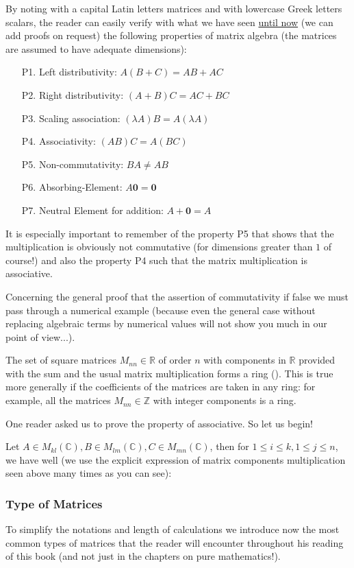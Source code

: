 	By noting with a capital Latin letters matrices and with lowercase Greek letters scalars, the reader can easily verify with what we have seen \underline{until now} (we can add proofs on request) the following properties of matrix algebra (the matrices are assumed to have adequate dimensions):
	\begin{enumerate}
		\item[P1.] Left distributivity: $A(B+C)=AB+AC$
		\item[P2.] Right distributivity: $(A+B)C=AC+BC$
		\item[P3.] Scaling association: $(\lambda A)B=A(\lambda A)$
		\item[P4.] Associativity: $(AB)C=A(BC)$
		\item[P5.] Non-commutativity: $BA\neq AB$
		\item[P6.] Absorbing-Element: $A\mathbf{0}=\mathbf{0}$
		\item[P7.] Neutral Element for addition: $A+\mathbf{0}=A$
	\end{enumerate}
	It is especially important to remember of the property P5 that shows that the multiplication is obviously not commutative (for dimensions greater than $1$ of course!) and also the property P4 such that the matrix multiplication is associative.
	
	Concerning the general proof that the assertion of commutativity if false we must pass through a numerical example (because even the general case without replacing algebraic terms by numerical values will not show you much in our point of view...).
	
	\begin{tcolorbox}[title=Remark,colframe=black,arc=10pt]
	The set of square matrices $M_{nn}\in \mathbb{R}$ of order $n$ with components in $\mathbb{R}$ provided with the sum and the usual matrix multiplication forms a ring (). This is true more generally if the coefficients of the matrices are taken in any ring: for example, all the matrices $M_{nn}\in \mathbb{Z}$  with integer components is a ring.
	\end{tcolorbox}
	One reader asked us to prove the property of associative. So let us begin!
	
	Let $A\in M_{kl}(\mathbb{C}),B\in M_{lm}(\mathbb{C}),C\in M_{mn}(\mathbb{C})$, then for $1\leq i\leq k,1\leq j\leq n$, we have well (we use the explicit expression of matrix components multiplication seen above many times as you can see):
	
	
	\subsubsection{Type of Matrices}
	To simplify the notations and length of calculations we introduce now the most common types of matrices that the reader will encounter throughout his reading of this book (and not just in the chapters on pure mathematics!).
	

